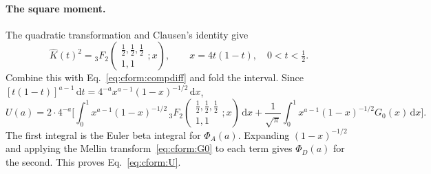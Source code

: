 \documentclass[11pt,a4paper]{article}
\numberwithin{equation}{section}
\newcommand{\dd}{\,\mathrm d}
\begin{document}
\paragraph{The square moment.} The quadratic transformation and Clausen's identity give
\begin{equation}
 \hat K(t)^2={}_3F_2\!\left(\begin{matrix}\frac12,\frac12,\frac12\\1,1\end{matrix};x\right),\qquad x=4t(1-t),\quad0<t<\tfrac12.
\end{equation}
Combine this with Eq.~\eqref{eq:cform:compdiff} and fold the interval. Since
$[t(1-t)]^{a-1}\dd t=4^{-a}x^{a-1}(1-x)^{-1/2}\dd x$,
\begin{equation}
 U(a)=2\cdot4^{-a}\biggl[\int_0^1x^{a-1}(1-x)^{-1/2}\,{}_3F_2\!\left(\begin{matrix}\frac12,\frac12,\frac12\\1,1\end{matrix};x\right)\dd x
 +\frac1{\sqrt\pi}\int_0^1x^{a-1}(1-x)^{-1/2}G_0(x)\dd x\biggr].
\end{equation}
The first integral is the Euler beta integral for $\Phi_A(a)$. Expanding $(1-x)^{-1/2}$ and applying the Mellin
transform~\eqref{eq:cform:G0} to each term gives $\Phi_D(a)$ for the second. This proves Eq.~\eqref{eq:cform:U}.
\end{document}
